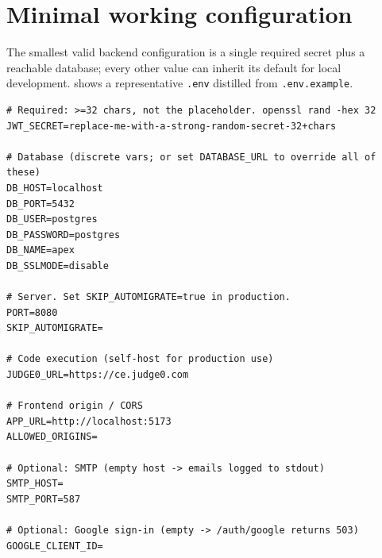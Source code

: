 \section{Minimal working configuration}

The smallest valid backend configuration is a single required secret plus a reachable database; every other value can inherit its default for local development.  shows a representative \texttt{.env} distilled from \texttt{.env.example}.

\begin{lstlisting}[caption={A minimal development \texttt{.env}.},label={lst:ap-c-env}]
# Required: >=32 chars, not the placeholder. openssl rand -hex 32
JWT_SECRET=replace-me-with-a-strong-random-secret-32+chars

# Database (discrete vars; or set DATABASE_URL to override all of these)
DB_HOST=localhost
DB_PORT=5432
DB_USER=postgres
DB_PASSWORD=postgres
DB_NAME=apex
DB_SSLMODE=disable

# Server. Set SKIP_AUTOMIGRATE=true in production.
PORT=8080
SKIP_AUTOMIGRATE=

# Code execution (self-host for production use)
JUDGE0_URL=https://ce.judge0.com

# Frontend origin / CORS
APP_URL=http://localhost:5173
ALLOWED_ORIGINS=

# Optional: SMTP (empty host -> emails logged to stdout)
SMTP_HOST=
SMTP_PORT=587

# Optional: Google sign-in (empty -> /auth/google returns 503)
GOOGLE_CLIENT_ID=
\end{lstlisting}
